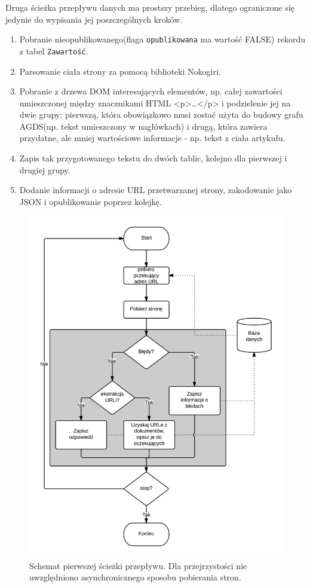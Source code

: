 Druga ścieżka przepływu danych ma prostszy przebieg, dlatego ograniczone się jedynie do wypisania jej poszczególnych kroków.
\begin{enumerate}
\item Pobranie nieopublikowanego(flaga \texttt{opublikowana} ma wartość FALSE) rekordu z tabel \texttt{Zawartość}.
\item Parsowanie ciała strony za pomocą biblioteki Nokogiri.
\item Pobranie z drzewa DOM interesujących elementów, np. całej zawartości umieszczonej między znacznikami HTML <p>\dots</p> i podzielenie jej na dwie grupy: pierwszą, która
obowiązkowo musi zostać użyta do budowy grafu AGDS(np. tekst umieszczony w nagłówkach) i drugą, która zawiera przydatne, ale mniej wartościowe informacje - np. tekst z ciała artykułu.
\item Zapis tak przygotowanego tekstu  do dwóch tablic, kolejno dla pierwszej i drugiej grupy.
\item Dodanie informacji o adresie URL przetwarzanej strony, zakodowanie jako JSON i opublikowanie poprzez kolejkę.
\end{enumerate}

\newpage

\begin{figure}[!h]
    \centering
    \label{graph:mri_przeplyw_1}
    \includegraphics[width=\textwidth]{mri_przeplyw_1}
    \caption{Schemat pierwszej ścieżki przepływu. Dla przejrzystości nie uwzględniono asynchronicznego sposobu pobierania stron.}
\end{figure}


